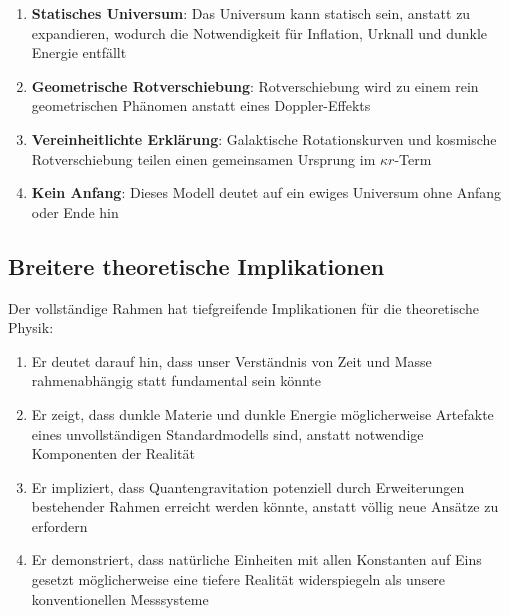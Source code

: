 \documentclass[12pt,a4paper]{article}
\begin{document}
	\begin{enumerate}
		\item \textbf{Statisches Universum}: Das Universum kann statisch sein, anstatt zu expandieren\cite{einstein1917}, wodurch die Notwendigkeit für Inflation\cite{guth1981}, Urknall\cite{hubble1929} und dunkle Energie\cite{perlmutter1999} entfällt
		\item \textbf{Geometrische Rotverschiebung}: Rotverschiebung wird zu einem rein geometrischen Phänomen anstatt eines Doppler-Effekts\cite{pascher_messdifferenzen_2025}
		\item \textbf{Vereinheitlichte Erklärung}: Galaktische Rotationskurven\cite{mcgaugh2016} und kosmische Rotverschiebung teilen einen gemeinsamen Ursprung im $\kappa r$-Term\cite{pascher_emergente_gravitation_2025}
		\item \textbf{Kein Anfang}: Dieses Modell deutet auf ein ewiges Universum ohne Anfang oder Ende hin\cite{pascher_part2_2025}
	\end{enumerate}
	
	\subsection{Breitere theoretische Implikationen}
	\label{subsec:theoretical_implications}
	
	Der vollständige Rahmen hat tiefgreifende Implikationen für die theoretische Physik\cite{pascher_zeit_masse_2025}:
	
	\begin{enumerate}
		\item Er deutet darauf hin, dass unser Verständnis von Zeit und Masse rahmenabhängig statt fundamental sein könnte\cite{pascher_komplementaer_2025}
		\item Er zeigt, dass dunkle Materie und dunkle Energie möglicherweise Artefakte eines unvollständigen Standardmodells sind, anstatt notwendige Komponenten der Realität\cite{pascher_galaxies_2025}
		\item Er impliziert, dass Quantengravitation potenziell durch Erweiterungen bestehender Rahmen erreicht werden könnte, anstatt völlig neue Ansätze zu erfordern\cite{pascher_emergente_gravitation_2025}
		\item Er demonstriert, dass natürliche Einheiten mit allen Konstanten auf Eins gesetzt möglicherweise eine tiefere Realität widerspiegeln als unsere konventionellen Messsysteme\cite{pascher_alphabeta_2025}
	\end{enumerate}
	
\end{document}
